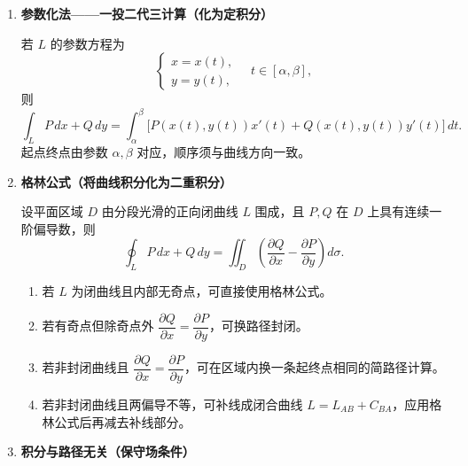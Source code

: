 \begin{enumerate}
\begin{enumerate}
                  \item \textbf{参数化法——一投二代三计算（化为定积分）}

                        若 $L$ 的参数方程为
                        \[
                              \begin{cases}
                                    x = x(t), \\
                                    y = y(t),
                              \end{cases}\quad t\in[\alpha,\beta],
                        \]
                        则
                        \[
                              \int_{L} P\,dx + Q\,dy
                              = \int_{\alpha}^{\beta}\!\big[P(x(t),y(t))x'(t) + Q(x(t),y(t))y'(t)\big]\,dt.
                        \]
                        起点终点由参数 $\alpha,\beta$ 对应，顺序须与曲线方向一致。

                  \item \textbf{格林公式（将曲线积分化为二重积分）}

                        设平面区域 $D$ 由分段光滑的正向闭曲线 $L$ 围成，且 $P,Q$ 在 $D$ 上具有连续一阶偏导数，则
                        \[
                              \oint_{L} P\,dx + Q\,dy = \iint_{D}\!\left(\frac{\partial Q}{\partial x}-\frac{\partial P}{\partial y}\right)\!d\sigma.
                        \]
                        \begin{enumerate}
                              \item 若 $L$ 为闭曲线且内部无奇点，可直接使用格林公式。
                              \item 若有奇点但除奇点外 $\dfrac{\partial Q}{\partial x}=\dfrac{\partial P}{\partial y}$，可换路径封闭。
                              \item 若非封闭曲线且 $\dfrac{\partial Q}{\partial x}=\dfrac{\partial P}{\partial y}$，可在区域内换一条起终点相同的简路径计算。
                              \item 若非封闭曲线且两偏导不等，可补线成闭合曲线 $L=L_{AB}+C_{BA}$，应用格林公式后再减去补线部分。
                        \end{enumerate}

                  \item \textbf{积分与路径无关（保守场条件）}


\end{enumerate}
\end{enumerate}
